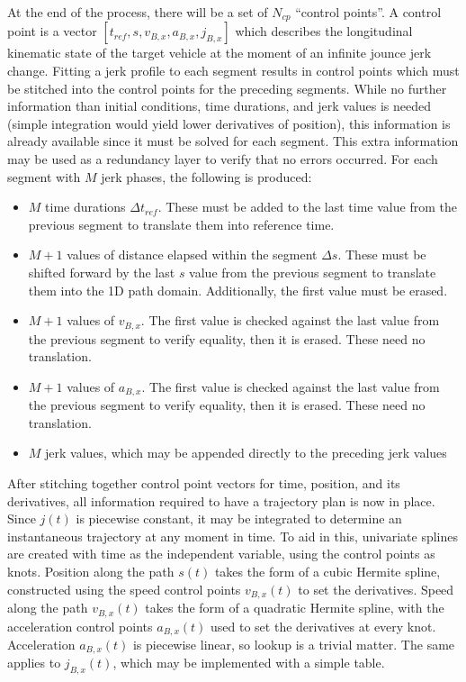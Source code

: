 \documentclass[letterpaper, 10 pt, conference]{ieeeconf}  %
\begin{document}
At the end of the process, there will be a set of $N_{cp}$ ``control points''.
A control point is a vector $[t_{ref}, s, v_{B,x}, a_{B,x}, j_{B,x}]$ which describes the longitudinal kinematic state of the target vehicle at the moment of an infinite jounce jerk change.
Fitting a jerk profile to each segment results in control points which must be stitched into the control points for the preceding segments.
While no further information than initial conditions, time durations, and jerk values is needed (simple integration would yield lower derivatives of position), this information is already available since it must be solved for each segment.
This extra information may be used as a redundancy layer to verify that no errors occurred.
For each segment with $M$ jerk phases, the following is produced:
\begin{itemize}
  \item $M$ time durations $\Delta t_{ref}$. These must be added to the last time value from the previous segment to translate them into reference time.
  \item $M+1$ values of distance elapsed within the segment $\Delta s$. These must be shifted forward by the last $s$ value from the previous segment to translate them into the 1D path domain. Additionally, the first value must be erased.
  \item $M+1$ values of $v_{B,x}$. The first value is checked against the last value from the previous segment to verify equality, then it is erased. These need no translation.
  \item $M+1$ values of $a_{B,x}$. The first value is checked against the last value from the previous segment to verify equality, then it is erased. These need no translation.
  \item $M$ jerk values, which may be appended directly to the preceding jerk values
\end{itemize}

After stitching together control point vectors for time, position, and its derivatives, all information required to have a trajectory plan is now in place.
Since $j(t)$ is piecewise constant, it may be integrated to determine an instantaneous trajectory at any moment in time.
To aid in this, univariate splines are created with time as the independent variable, using the control points as knots.
Position along the path $s(t)$ takes the form of a cubic Hermite spline, constructed using the speed control points $v_{B,x}(t)$ to set the derivatives.
Speed along the path $v_{B,x}(t)$ takes the form of a quadratic Hermite spline, with the acceleration control points $a_{B,x}(t)$ used to set the derivatives at every knot.
Acceleration $a_{B,x}(t)$ is piecewise linear, so lookup is a trivial matter.
The same applies to $j_{B,x}(t)$, which may be implemented with a simple table.
\end{document}
